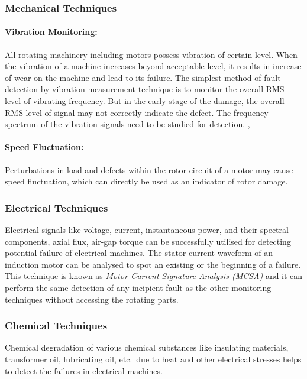 \documentclass[a4paper,11pt]{article}
\begin{document}
\subsubsection{Mechanical Techniques}
\paragraph{Vibration Monitoring:} All rotating machinery including motors possess vibration of certain level. When the vibration of a machine increases beyond acceptable level, it results in increase of wear on the machine and lead to its failure. The simplest method of fault detection by vibration measurement technique is to monitor the overall RMS level of vibrating frequency. But in the early stage of the damage, the overall RMS level of signal may not correctly indicate the defect. The frequency spectrum of the vibration signals need to be studied for detection. \cite{rps6},\cite{rps14}

\paragraph{Speed Fluctuation:} Perturbations in load and defects within the rotor circuit of a motor may cause speed fluctuation, which can directly be used as an indicator of rotor damage.

\subsubsection{Electrical Techniques}
Electrical signals like voltage, current, instantaneous power, and their spectral components, axial flux, air-gap torque can be successfully utilised for detecting potential failure of electrical machines. The stator current waveform of an induction motor can be analysed to spot an existing or the beginning of a failure. This technique is known as \emph{Motor Current Signature Analysis (MCSA)} and it can perform the same detection of any incipient fault as the other monitoring techniques without accessing the rotating parts. \cite{57}

\subsubsection{Chemical Techniques}
Chemical degradation of various chemical substances like insulating materials, transformer oil, lubricating oil, etc.~due to heat and other electrical stresses helps to detect the failures in electrical machines. \cite{rps6}
\end{document}
